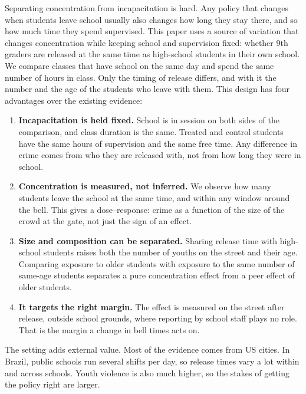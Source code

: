 Separating concentration from incapacitation is hard. Any policy that changes
when students leave school usually also changes how long they stay there, and
so how much time they spend supervised. This paper uses a source of variation
that changes concentration while keeping school and supervision fixed: whether
9th graders are released at the same time as high-school students in their own
school. We compare classes that have school on the same day and spend the same
number of hours in class. Only the timing of release differs, and with it the
number and the age of the students who leave with them. This design has four
advantages over the existing evidence:
\begin{enumerate}
  \item \textbf{Incapacitation is held fixed.} School is in session on both
        sides of the comparison, and class duration is the same. Treated and
        control students have the same hours of supervision and the same free
        time. Any difference in crime comes from who they are released with,
        not from how long they were in school.
  \item \textbf{Concentration is measured, not inferred.} We observe how many
        students leave the school at the same time, and within any window
        around the bell. This gives a dose--response: crime as a function of
        the size of the crowd at the gate, not just the sign of an effect.
  \item \textbf{Size and composition can be separated.} Sharing release time
        with high-school students raises both the number of youths on the
        street and their age. Comparing exposure to older students with
        exposure to the same number of same-age students separates a pure
        concentration effect from a peer effect of older students.
  \item \textbf{It targets the right margin.} The effect is measured on the
        street after release, outside school grounds, where reporting by school
        staff plays no role. That is the margin a change in bell times acts on.
\end{enumerate}
The setting adds external value. Most of the evidence comes from US cities. In
Brazil, public schools run several shifts per day, so release times vary a lot
within and across schools. Youth violence is also much higher, so the stakes of
getting the policy right are larger.



